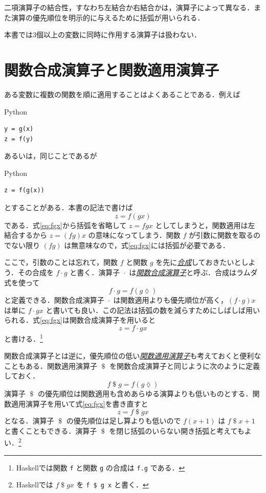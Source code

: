 \documentclass[a4paper]{jsbook}
\newcommand{\programminglanguage}[1]{\textsf{#1}}
\newcommand{\haskell}{\programminglanguage{Haskell}}
\newcommand{\python}{\programminglanguage{Python}}
\newcommand{\keyword}[1]{{\underline{\emph{#1}}}}
\newcommand{\code}[1]{\texttt{#1}}
\newenvironment{pythoncode}{\begin{itembox}[r]{\python}}{\end{itembox}}
\newcommand{\mAnonParameter}{\lozenge}
\DeclareMathOperator{\mComp}{\cdot}
\DeclareMathOperator{\mApply}{\$}
\begin{document}
二項演算子の結合性，すなわち左結合か右結合かは，演算子によって異なる．また演算の優先順位を明示的に与えるために括弧が用いられる．

本書では3個以上の変数に同時に作用する演算子は扱わない．

\section{関数合成演算子と関数適用演算子}

ある変数に複数の関数を順に適用することはよくあることである．例えば
\begin{pythoncode}
\begin{verbatim}
y = g(x)
z = f(y)
\end{verbatim}
\end{pythoncode}
あるいは，同じことであるが
\begin{pythoncode}
\begin{verbatim}
z = f(g(x))
\end{verbatim}
\end{pythoncode}
とすることがある．本書の記法で書けば
\begin{equation}
\label{eq:fgx}
z=f(gx)
\end{equation}
である．式\eqref{eq:fgx}から括弧を省略して $z=fgx$ としてしまうと，関数適用は左結合するから $z=(fg)x$ の意味になってしまう．関数 $f$ が引数に関数を取るのでない限り $(fg)$ は無意味なので，式\eqref{eq:fgx}には括弧が必要である．

ここで，引数のことは忘れて，関数 $f$ と関数 $g$ を先に\keyword{合成}しておきたいとしよう．その合成を $f\mComp g$ と書く．演算子 $\mComp$ は\keyword{関数合成演算子}と呼ぶ．合成はラムダ式を使って
\begin{equation}
f\mComp g=f(g\mAnonParameter)
\end{equation}
と定義できる．関数合成演算子 $\mComp$ は関数適用よりも優先順位が高く，$\left(f\mComp g\right)x$ は単に $f\mComp gx$ と書いても良い．この記法は括弧の数を減らすためにしばしば用いられる．式\eqref{eq:fgx}は関数合成演算子を用いると
\begin{equation}
z=f\mComp gx
\end{equation}
と書ける．\footnote{\haskell では関数 \code{f} と関数 \code{g} の合成は \code{f.g} である．}

関数合成演算子とは逆に，優先順位の低い\keyword{関数適用演算子}も考えておくと便利なこともある．関数適用演算子 $\mApply$ を関数合成演算子と同じように次のように定義しておく．
\begin{equation}
f\mApply g=f\left(g\mAnonParameter\right)
\end{equation}
演算子 $\mApply$ の優先順位は関数適用も含めあらゆる演算よりも低いものとする．関数適用演算子を用いて式\eqref{eq:fgx}を書き直すと
\begin{equation}
z=f\mApply gx
\end{equation}
となる．演算子 $\mApply$ の優先順位は足し算よりも低いので $f(x+1)$ は $f\mApply  x+1$ と書くこともできる．演算子 $\mApply$ を閉じ括弧のいらない開き括弧と考えてもよい．\footnote{\haskell では $f\mApply gx$ を \code{f \$ g x} と書く．}
\end{document}
